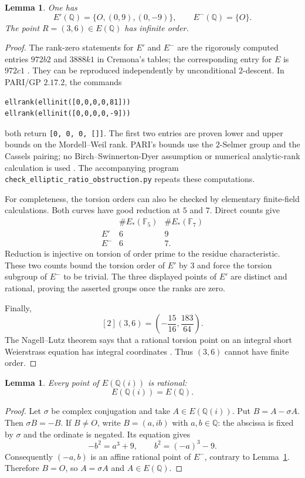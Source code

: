 \documentclass[11pt,a4paper]{article}
\newtheorem{lemma}[theorem]{Lemma}
\theoremstyle{definition}
\newcommand{\Q}{\mathbb Q}\newcommand{\Z}{\mathbb Z}
\begin{document}
\begin{lemma}\label{lem:groups}
One has
\[
 E'(\Q)=\{O,(0,9),(0,-9)\},\qquad E^-(\Q)=\{O\}.
\]
The point $R=(3,6)\in E(\Q)$ has infinite order.
\end{lemma}
\begin{proof}
The rank-zero statements for $E'$ and $E^-$ are the rigorously computed
entries $972b2$ and $3888k1$ in Cremona's tables; the corresponding
entry for $E$ is $972c1$ \cite{CremonaData,LMFDB81,LMFDBReliability}.
They can be reproduced independently by unconditional $2$-descent.
In PARI/GP $2.17.2$, the commands
\begin{verbatim}
ellrank(ellinit([0,0,0,0,81]))
ellrank(ellinit([0,0,0,0,-9]))
\end{verbatim}
both return \verb|[0, 0, 0, []]|. The first two entries are proven
lower and upper bounds on the Mordell--Weil rank. PARI's bounds
use the $2$-Selmer group and the Cassels pairing; no Birch--Swinnerton-Dyer
assumption or numerical analytic-rank calculation is used
\cite[\texttt{ellrank}]{PARI}. The accompanying program
\nolinkurl{check_elliptic_ratio_obstruction.py} repeats these computations.

For completeness, the torsion orders can also be checked by elementary
finite-field calculations. Both curves have good reduction at $5$ and
$7$. Direct counts give
\[
\begin{array}{c|cc}
 &\#E_*(\mathbb F_5)&\#E_*(\mathbb F_7)\\\hline
 E'&6&9\\
 E^-&6&7.
\end{array}
\]
Reduction is injective on torsion of order prime to the residue
characteristic. These two counts bound the torsion order of $E'$ by
$3$ and force the torsion subgroup of $E^-$ to be trivial. The three
displayed points of $E'$ are distinct and rational, proving the asserted
groups once the ranks are zero.

Finally,
\[
                 [2](3,6)=\left(-\frac{15}{16},\frac{183}{64}\right).
\]
The Nagell--Lutz theorem says that a rational torsion point on an
integral short Weierstrass equation has integral coordinates
\cite[Chapter VIII, Section 7]{Silverman}. Thus $(3,6)$ cannot have
finite order.
\end{proof}

\begin{lemma}\label{lem:exact-stability}
Every point of $E(\Q(i))$ is rational:
\[
                          E(\Q(i))=E(\Q).
\]
\end{lemma}
\begin{proof}
Let $\sigma$ be complex conjugation and take $A\in E(\Q(i))$.
Put $B=A-\sigma A$. Then $\sigma B=-B$.
If $B\ne O$, write $B=(a,ib)$ with $a,b\in\Q$: the abscissa is
fixed by $\sigma$ and the ordinate is negated. Its equation gives
\[
              -b^2=a^3+9,\qquad b^2=(-a)^3-9.
\]
Consequently $(-a,b)$ is an affine rational point of $E^-$,
contrary to Lemma~\ref{lem:groups}. Therefore $B=O$,
so $A=\sigma A$ and $A\in E(\Q)$.
\end{proof}
\end{document}
